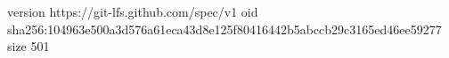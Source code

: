 version https://git-lfs.github.com/spec/v1
oid sha256:104963e500a3d576a61eca43d8e125f80416442b5abccb29c3165ed46ee59277
size 501
